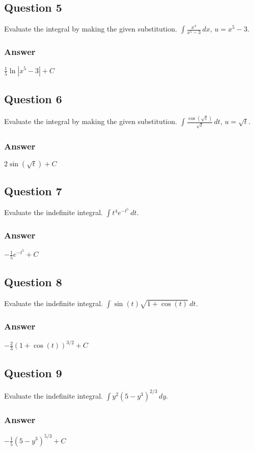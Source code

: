 \documentclass{article}
\begin{document}
\subsection*{Question 5}
Evaluate the integral by making the given substitution. $\int \frac{x^4}{x^5 - 3} \,dx$, $u = x^5 - 3$.
\subsubsection*{Answer}
$ \frac{1}{5}\ln|x^5 - 3| + C $

\subsection*{Question 6}
Evaluate the integral by making the given substitution. $\int \frac{\cos(\sqrt{t})}{\sqrt{t}} \,dt$, $u = \sqrt{t}$.
\subsubsection*{Answer}
$ 2\sin(\sqrt{t}) + C $

\subsection*{Question 7}
Evaluate the indefinite integral. $\int t^4 e^{-t^5} \,dt$.
\subsubsection*{Answer}
$ -\frac{1}{5}e^{-t^5} + C $

\subsection*{Question 8}
Evaluate the indefinite integral. $\int \sin(t)\sqrt{1 + \cos(t)} \,dt$.
\subsubsection*{Answer}
$ -\frac{2}{3}(1 + \cos(t))^{3/2} + C $

\subsection*{Question 9}
Evaluate the indefinite integral. $\int y^2(5-y^3)^{2/3} \,dy$.
\subsubsection*{Answer}
$ -\frac{1}{5}(5 - y^3)^{5/3} + C $
\end{document}
